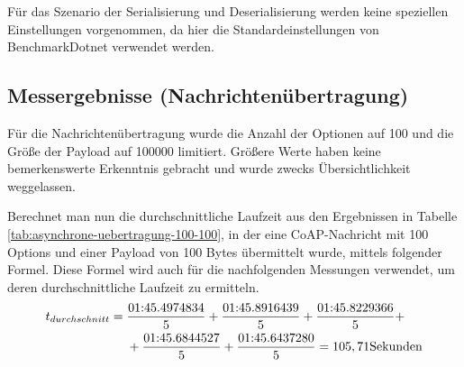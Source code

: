 Für das Szenario der Serialisierung und Deserialisierung werden keine speziellen Einstellungen vorgenommen, da hier die Standardeinstellungen von BenchmarkDotnet verwendet werden.

\subsection{Messergebnisse (Nachrichtenübertragung)}
\label{subsec:messergebnisse-nachrichtenuebertragung}

Für die Nachrichtenübertragung wurde die Anzahl der Optionen auf 100 und die Größe der Payload auf 100000 limitiert. Größere Werte haben keine bemerkenswerte Erkenntnis gebracht und wurde zwecks Übersichtlichkeit weggelassen.

\begin{table}[h]
    \caption{Asynchrone Übertragung mit 100 Options und mit einer Payload von 100 Bytes.}
    \label{tab:asynchrone-uebertragung-100-100}
\end{table}

Berechnet man nun die durchschnittliche Laufzeit aus den Ergebnissen in Tabelle \ref{tab:asynchrone-uebertragung-100-100}, in der eine CoAP-Nachricht mit 100 Options und einer Payload von 100 Bytes übermittelt wurde, mittels folgender Formel. Diese Formel wird auch für die nachfolgenden Messungen verwendet, um deren durchschnittliche Laufzeit zu ermitteln.
\begin{equation}
    \begin{aligned}
        t_{durchschnitt} ={} & \frac{\textnormal{01:45.4974834}}{5} + \frac{\textnormal{01:45.8916439}}{5} + \frac{\textnormal{01:45.8229366}}{5} + \\
        & + \frac{\textnormal{01:45.6844527}}{5} + \frac{\textnormal{01:45.6437280}}{5} = 105,71 \textnormal{Sekunden}
    \end{aligned}
\end{equation}

